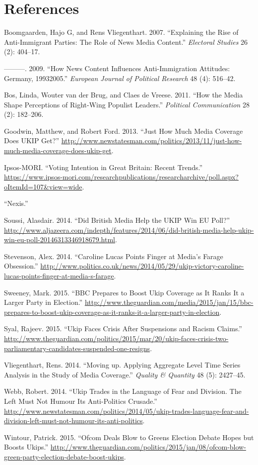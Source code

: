 \documentclass[12pt,article]{article}
\begin{document}
\pagebreak

\section*{References}\label{references}

Boomgaarden, Hajo G, and Rens Vliegenthart. 2007. ``Explaining the Rise
of Anti-Immigrant Parties: The Role of News Media Content.''
\emph{Electoral Studies} 26 (2): 404--17.

---------. 2009. ``How News Content Influences Anti-Immigration
Attitudes: Germany, 19932005.'' \emph{European Journal of Political
Research} 48 (4): 516--42.

Bos, Linda, Wouter van der Brug, and Claes de Vreese. 2011. ``How the
Media Shape Perceptions of Right-Wing Populist Leaders.''
\emph{Political Communication} 28 (2): 182--206.

Goodwin, Matthew, and Robert Ford. 2013. ``Just How Much Media Coverage
Does UKIP Get?''
\url{http://www.newstatesman.com/politics/2013/11/just-how-much-media-coverage-does-ukip-get}.

Ipsos-MORI. ``Voting Intention in Great Britain: Recent Trends.''
\url{https://www.ipsos-mori.com/researchpublications/researcharchive/poll.aspx?oItemId=107\&view=wide}.

``Nexis.''

Soussi, Alasdair. 2014. ``Did British Media Help the UKIP Win EU Poll?''
\url{http://www.aljazeera.com/indepth/features/2014/06/did-british-media-help-ukip-win-eu-poll-20146313346918679.html}.

Stevenson, Alex. 2014. ``Caroline Lucas Points Finger at Media's Farage
Obsession.''
\url{http://www.politics.co.uk/news/2014/05/29/ukip-victory-caroline-lucas-points-finger-at-media-s-farage}.

Sweeney, Mark. 2015. ``BBC Prepares to Boost Ukip Coverage as It Ranks
It a Larger Party in Election.''
\url{http://www.theguardian.com/media/2015/jan/15/bbc-prepares-to-boost-ukip-coverage-as-it-ranks-it-a-larger-party-in-election}.

Syal, Rajeev. 2015. ``Ukip Faces Crisis After Suspensions and Racism
Claims.''
\url{http://www.theguardian.com/politics/2015/mar/20/ukip-faces-crisis-two-parliamentary-candidates-suspended-one-resigns}.

Vliegenthart, Rens. 2014. ``Moving up. Applying Aggregate Level Time
Series Analysis in the Study of Media Coverage.'' \emph{Quality \&
Quantity} 48 (5): 2427--45.

Webb, Robert. 2014. ``Ukip Trades in the Language of Fear and Division.
The Left Must Not Humour Its Anti-Politics Crusade.''
\url{http://www.newstatesman.com/politics/2014/05/ukip-trades-language-fear-and-division-left-must-not-humour-its-anti-politics}.

Wintour, Patrick. 2015. ``Ofcom Deals Blow to Greens Election Debate
Hopes but Boosts Ukips.''
\url{http://www.theguardian.com/politics/2015/jan/08/ofcom-blow-green-party-election-debate-boost-ukips}.
\end{document}
